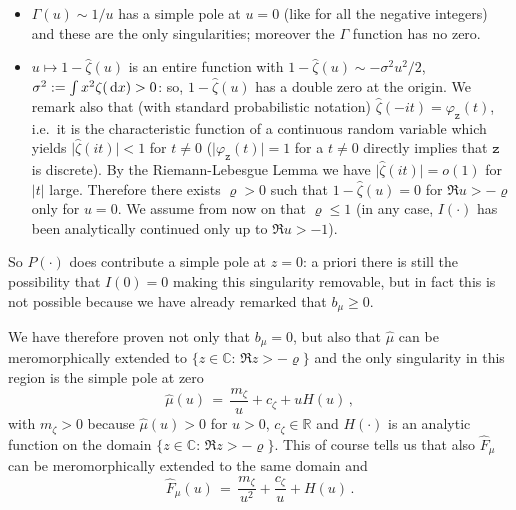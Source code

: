 \documentclass[reqno,11pt]{amsart}
\numberwithin{equation}{section}
\newtheorem{rem}[theorem]{Remark}
\newcommand{\dd}{\,\text{\rm d}}             %
\newcommand{\bbC}{{\ensuremath{\mathbb C}} }
\newcommand{\bbR}{{\ensuremath{\mathbb R}} }
\newcommand{\gp}{\varphi}
\newcommand{\gz}{\zeta}
\newcommand{\gG}{\Gamma}
\newcommand{\gs}{\sigma}
\newcommand{\logZ}{\mathtt{z}}
\begin{document}
\begin{itemize}
\item
$ \gG(u)\sim 1/u$ has a simple pole at $u=0$ (like for all the negative integers) and these are the only singularities; 
moreover the $\Gamma$ function has no zero.
\item
  $u \mapsto 1-\widehat \gz(u)$ is an entire function with
$1-\widehat \gz(u)\sim - \gs^2 u^2/2$,  $\gs^2:= \int x^2 \gz(\dd x)>0$: so, $1-\widehat \gz(u)$ has a double zero at the origin. We remark also that (with standard probabilistic notation)
$\widehat \gz(-it)=\gp_\logZ(t)$, i.e.\ it  is the characteristic function of a continuous random variable which yields   $\vert \widehat \gz(it)\vert< 1$
for $t\neq 0$ ($\vert\gp_\logZ(t)\vert=1$ for a $t\neq 0$ directly implies that $\logZ$ is discrete). By the Riemann-Lebesgue Lemma  we have $\vert \widehat \gz(it)\vert=o(1)$  for $\vert t \vert $
large. Therefore there exists $\varrho>0$ such that $1-\widehat \gz(u)=0$ for $\Re u >- \varrho$ only for $u=0$. We assume from now on that $\varrho \le 1$ (in any case,  $I(\cdot)$  has  been analytically continued only up to $\Re u >- 1$).
\end{itemize}

\smallskip

So $P(\cdot)$ does contribute a simple pole at $z=0$: a priori there is still the possibility that $I(0)=0$ making this singularity removable, but in fact this is not possible because we have already remarked that $b_\mu \ge 0$. 

\smallskip

We have therefore proven not only that $b_\mu=0$, but also that
$\widehat \mu $ can be meromorphically extended to $\{z \in \bbC:\, \Re z >-\varrho \}$ and the only singularity in this region is the simple pole at zero
\begin{equation}
 \widehat \mu (u)   \,=\,  \frac {m_\gz} u +c_\gz + u H(u) \, ,
\end{equation}
with $m_\gz>0$ because $\widehat\mu(u)>0$ for $u>0$, $c_\gz \in \bbR$ and $H(\cdot)$ is an analytic function on the domain $\{z \in \bbC:\, \Re z >-\varrho \}$. This of course tells us that also 
$\widehat F_\mu$ can be meromorphically extended to the same domain and 
\begin{equation}
 \widehat F_\mu(u)   \,=\,  \frac {m_\gz} {u^2} +\frac{c_\gz} u +  H(u) \, .
\end{equation}
\medskip

 
\end{document}

